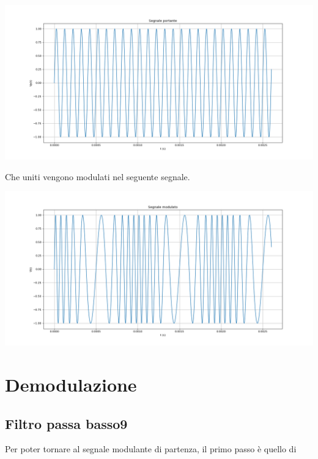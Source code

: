 \documentclass{article}
\begin{document}
\begin{center}
    \includegraphics[width=\textwidth]{portante.png}
\end{center}

\newpage
Che uniti vengono modulati nel seguente segnale.

\begin{center}
    \includegraphics[width=\textwidth]{modulato.png}
\end{center}

\section{Demodulazione}
\subsection{Filtro passa basso9}
Per poter tornare al segnale modulante di partenza, il primo passo è quello di 
\end{document}
